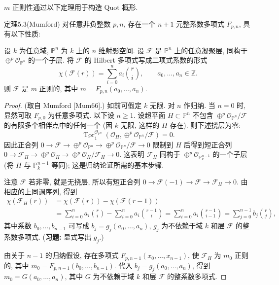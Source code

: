 $m$ 正则性通过以下定理用于构造 Quot 概形.
\begin{origstatement}{定理}{5.3}(Mumford)\label{ch05:thm5.3}
对任意非负整数 $p,n$, 存在一个 $n+1$ 元整系数多项式 $F_{p,n}$, 具有以下性质:

设 $k$ 为任意域, $\mathbb P^n$ 为 $k$ 上的 $n$ 维射影空间. 设 $\mathcal F$ 是 $\mathbb P^n$ 上的任意凝聚层, 同构于 $\oplus^p\mathcal O_{\mathbb P^n}$ 的一个子层. 将 $\mathcal F$ 的 Hilbert 多项式写成二项式系数的形式
\[
 \chi(\mathcal F(r))=\sum_{i=0}^n a_i\binom ri,\qquad a_0,\ldots,a_n\in\mathbb Z.
\]
则 $\mathcal F$ 是 $m$ 正则的, 其中 $m=F_{p,n}(a_0,\ldots,a_n)$.
\end{origstatement}
\begin{proof}
(取自 Mumford [Mum66].) 如前可假定 $k$ 无限. 对 $n$ 作归纳. 当 $n=0$ 时, 显然可取 $F_{p,0}$ 为任意多项式. 以下设 $n\geq1$. 设超平面 $H\subset\mathbb P^n$ 不包含 $\oplus^p\mathcal O_{\mathbb P^n}/\mathcal F$ 的有限多个相伴点中的任何一个 (因 $k$ 无限, 这样的 $H$ 存在). 则下述挠层为零:
\[
 \underline{\operatorname{Tor}}^{\mathcal O_{\mathbb P^n}}_1
 (\mathcal O_H,\oplus^p\mathcal O_{\mathbb P^n}/\mathcal F)=0.
\]
因此正合列 $0\to\mathcal F\to\oplus^p\mathcal O_{\mathbb P^n}\to\oplus^p\mathcal O_{\mathbb P^n}/\mathcal F\to0$ 限制到 $H$ 后得到短正合列 $0\to\mathcal F_H\to\oplus^p\mathcal O_H\to\oplus^p\mathcal O_H/\mathcal F_H\to0$. 这表明 $\mathcal F_H$ 同构于 $\oplus^p\mathcal O_{\mathbb P^{n-1}_k}$ 的一个子层 (将 $H$ 与 $\mathbb P^{n-1}_k$ 等同); 这是归纳论证所需的基本步骤.

注意 $\mathcal F$ 若非零, 就是无挠层, 所以有短正合列 $0\to\mathcal F(-1)\to\mathcal F\to\mathcal F_H\to0$. 由相应的上同调序列, 得到
\[
\begin{aligned}
 \chi(\mathcal F_H(r))
 &=\chi(\mathcal F(r))-\chi(\mathcal F(r-1))\\
 &=\sum_{i=0}^n a_i\binom ri-\sum_{i=0}^n a_i\binom{r-1}{i}
 =\sum_{i=0}^n a_i\binom{r-1}{i-1}
 =\sum_{j=0}^{n-1}b_j\binom rj,
\end{aligned}
\]
其中系数 $b_0,\ldots,b_{n-1}$ 可写成 $b_j=g_j(a_0,\ldots,a_n)$, $g_j$ 为不依赖于域 $k$ 和层 $\mathcal F$ 的整系数多项式.
(\textbf{习题:} 显式写出 $g_j$.)

由关于 $n-1$ 的归纳假设, 存在多项式 $F_{p,n-1}(x_0,\ldots,x_{n-1})$, 使 $\mathcal F_H$ 为 $m_0$ 正则的, 其中 $m_0=F_{p,n-1}(b_0,\ldots,b_{n-1})$. 代入 $b_j=g_j(a_0,\ldots,a_n)$, 得到 $m_0=G(a_0,\ldots,a_n)$, 其中 $G$ 为不依赖于域 $k$ 和层 $\mathcal F$ 的整系数多项式.


\end{proof}
